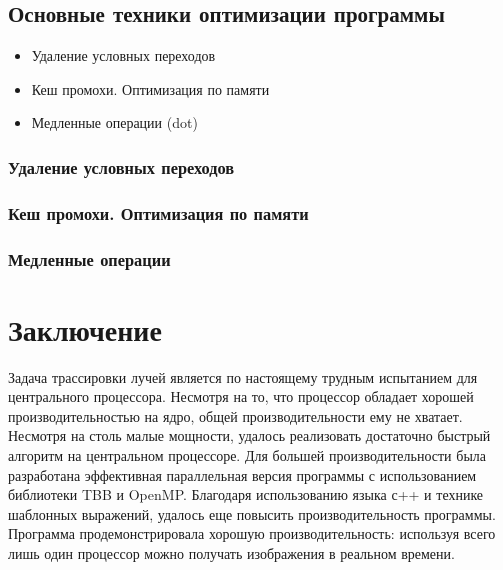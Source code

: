 \documentclass[12pt, a4paper, utf8]{article}
\begin{document}
\subsection{Основные техники оптимизации программы}

\begin{itemize}
\item Удаление условных переходов
\item Кеш промохи. Оптимизация по памяти
\item Медленные операции (dot)
\end{itemize}

\subsubsection{Удаление условных переходов}


\subsubsection{Кеш промохи. Оптимизация по памяти}


\subsubsection{Медленные операции}



\newpage
\section*{Заключение}
Задача трассировки лучей является по настоящему трудным испытанием для центрального процессора. Несмотря на то, что процессор обладает хорошей производительностью на ядро, общей производительности ему не хватает. Несмотря на столь малые мощности, удалось реализовать достаточно быстрый алгоритм на центральном процессоре. Для большей производительности была разработана эффективная параллельная версия программы с использованием библиотеки TBB и OpenMP. Благодаря использованию языка с++ и технике шаблонных выражений, удалось еще повысить производительность программы. Программа продемонстрировала хорошую производительность: используя всего лишь один процессор можно получать изображения в реальном времени.
\end{document}
